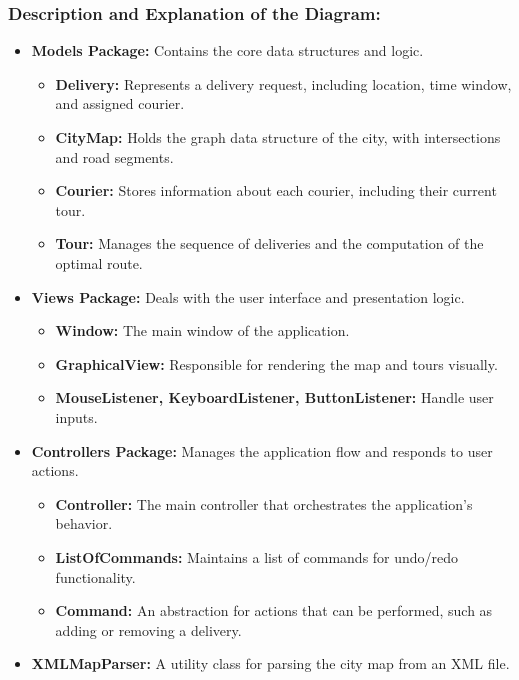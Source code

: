 \documentclass{article}
\begin{document}
\subsubsection{Description and Explanation of the Diagram:}
\begin{itemize}
    \item \textbf{Models Package:} Contains the core data structures and logic.
    \begin{itemize}
        \item \textbf{Delivery:} Represents a delivery request, including location, time window, and assigned courier.
        \item \textbf{CityMap:} Holds the graph data structure of the city, with intersections and road segments.
        \item \textbf{Courier:} Stores information about each courier, including their current tour.
        \item \textbf{Tour:} Manages the sequence of deliveries and the computation of the optimal route.
    \end{itemize}
    \item \textbf{Views Package:} Deals with the user interface and presentation logic.
    \begin{itemize}
        \item \textbf{Window:} The main window of the application.
        \item \textbf{GraphicalView:} Responsible for rendering the map and tours visually.
        \item \textbf{MouseListener, KeyboardListener, ButtonListener:} Handle user inputs.
    \end{itemize}
    \item \textbf{Controllers Package:} Manages the application flow and responds to user actions.
    \begin{itemize}
        \item \textbf{Controller:} The main controller that orchestrates the application's behavior.
        \item \textbf{ListOfCommands:} Maintains a list of commands for undo/redo functionality.
        \item \textbf{Command:} An abstraction for actions that can be performed, such as adding or removing a delivery.
    \end{itemize}
    \item \textbf{XMLMapParser:} A utility class for parsing the city map from an XML file.
\end{itemize}
\end{document}
